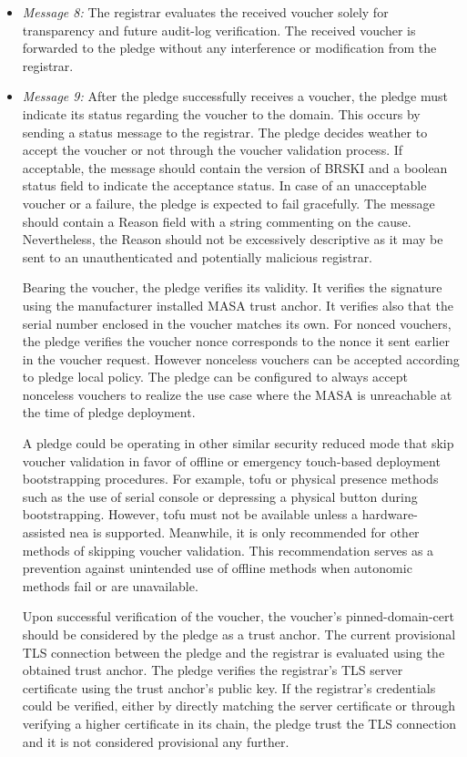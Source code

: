 \begin{itemize}
	\item \textit{Message 8:} The registrar evaluates the received voucher solely for transparency and future audit-log verification. The received voucher is forwarded to the pledge without any interference or modification from the registrar.

	\item \textit{Message 9:}
 	 After the pledge successfully receives a voucher, the pledge must indicate its status regarding the voucher to the domain. This occurs by sending a status message to the registrar. The pledge decides weather to accept the voucher or not through the voucher validation process. If acceptable, the message should contain the version of BRSKI and a boolean status field to indicate the acceptance status. In case of an unacceptable voucher or a failure, the pledge is expected to fail gracefully. The message should contain a Reason field with a string commenting on the cause. Nevertheless, the Reason should not be excessively descriptive as it may be sent to an unauthenticated and potentially malicious registrar.
	 \par
	 Bearing the voucher, the pledge verifies its validity. It verifies the signature using the manufacturer installed MASA trust anchor. It verifies also that the serial number enclosed in the voucher matches its own. For nonced vouchers, the pledge verifies the voucher nonce corresponds to the nonce it sent earlier in the voucher request. However nonceless vouchers can be accepted according to pledge local policy. The pledge can be configured to always accept nonceless vouchers to realize the use case where the MASA is unreachable at the time of pledge deployment.
	 \par
 	 A pledge could be operating in other similar security reduced mode that skip voucher validation in favor of offline or emergency touch-based deployment bootstrapping procedures. For example, \gls{tofu} or physical presence methods such as the use of serial console or depressing a physical button during bootstrapping. However, \gls{tofu} must not be available unless a hardware-assisted \gls{nea} is supported. Meanwhile, it is only recommended for other methods of skipping voucher validation. This recommendation serves as a prevention against unintended use of offline methods when autonomic methods fail or are unavailable.
	 \par
	 Upon successful verification of the voucher, the voucher's pinned-domain-cert should be considered by the pledge as a trust anchor. The current provisional TLS connection between the pledge and the registrar is evaluated using the obtained trust anchor. The pledge verifies the registrar's TLS server certificate using the trust anchor's public key. If the registrar's credentials could be verified, either by directly matching the server certificate or through verifying a higher certificate in its chain, the pledge trust the TLS connection and it is not considered provisional any further.
	 

\end{itemize}
